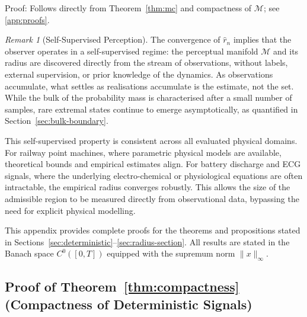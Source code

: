 \documentclass[10pt]{article}
\theoremstyle{plain}
\theoremstyle{definition}
\theoremstyle{remark}
\newtheorem{remark}[theorem]{Remark}
\begin{document}
\noindent Proof: Follows directly from Theorem~\ref{thm:mc} and compactness of 
$\mathcal{M}$; see \ref{app:proofs}.

\begin{remark}[Self-Supervised Perception]
The convergence of $\hat{r}_n$ implies that the observer operates in a 
self-supervised regime: the perceptual manifold $\mathcal{M}$ and its radius 
are discovered directly from the stream of observations, without labels, 
external supervision, or prior knowledge of the dynamics. 
As observations accumulate, what settles as realisations accumulate is the estimate, not the set. While the bulk of the probability mass is
characterised after a small number of samples, rare extremal states continue
to emerge asymptotically, as quantified in Section~\ref{sec:bulk-boundary}.
\end{remark}

This self-supervised property is consistent across all evaluated physical
domains. For railway point machines, where parametric physical models are
available, theoretical bounds and empirical estimates align. For battery
discharge and ECG signals, where the underlying electro-chemical or physiological
equations are often intractable, the empirical radius converges robustly. This
allows the size of the admissible region to be measured
directly from observational data, bypassing the need for explicit physical
modelling.



\label{app:proofs}

This appendix provides complete proofs for the theorems and propositions stated
in Sections~\ref{sec:deterministic}--\ref{sec:radius-section}. All results are stated in the Banach space 
$C^0([0,T])$ equipped with the supremum norm $\|x\|_\infty$.

\subsection{Proof of Theorem~\ref{thm:compactness} (Compactness of Deterministic Signals)}
\end{document}
